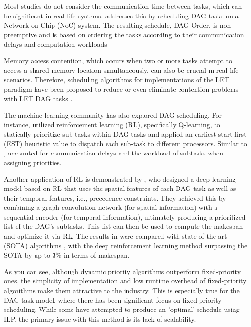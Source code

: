 Most studies do not consider the communication time between tasks, 
which can be significant in real-life systems. 
\cite{ChenDAGorder2023} addresses this by scheduling DAG tasks on a 
Network on Chip (NoC) system. The resulting schedule, DAG-Order, 
is non-preemptive and is based on ordering the tasks according to 
their communication delays and computation workloads.

Memory access contention, which occurs when two or more tasks 
attempt to access a shared memory location simultaneously, can 
also be crucial in real-life scenarios. Therefore, scheduling 
algorithms for implementations of the LET paradigm have been 
proposed to reduce or even eliminate contention problems with LET 
DAG tasks \cite{Yano2021ContentionFree}\cite{Igarashi2020HeuristicContFree}.
\newline


The machine learning community has also explored DAG scheduling. 
For instance, \cite{yano2021work} utilized reinforcement 
learning (RL), specifically Q-learning, to statically prioritize 
sub-tasks within DAG tasks and applied an 
earliest-start-first (EST) heuristic value to dispatch each 
sub-task to different processors. Similar to \cite{ChenDAGorder2023}, 
\cite{yano2021work} accounted for communication delays and the 
workload of subtasks when assigning priorities.

Another application of RL is demonstrated by 
\cite{lee2021DAGDeeplearning}, who designed a deep learning model 
based on RL that uses the spatial features of each DAG task as well 
as their temporal features, i.e., precedence constraints. They 
achieved this by combining a graph convolution network 
(for spatial information) with a sequential encoder 
(for temporal information), ultimately producing a prioritized list 
of the DAG's subtasks. This list can then be used to compute 
the makespan and optimize it via RL. The results in 
\cite{lee2021DAGDeeplearning} were compared with state-of-the-art (SOTA) 
algorithms \cite{he2019intra}\cite{zhao2020dag}, with the deep 
reinforcement learning method surpassing the SOTA by up to 3\% 
in terms of makespan.



As you can see, although dynamic priority algorithms outperform 
fixed-priority ones, the simplicity of implementation and low runtime 
overhead of fixed-priority algorithms make them attractive to the 
industry. This is especially true for the DAG task model, where 
there has been significant focus on fixed-priority scheduling. While 
some have attempted to produce an 'optimal' schedule using 
ILP\cite{wei2011reliabilityILP}\cite{yip2014relaxing}\cite{ChangMinWRCTBoundILP2022}, 
the primary issue with this method is its lack of scalability.

